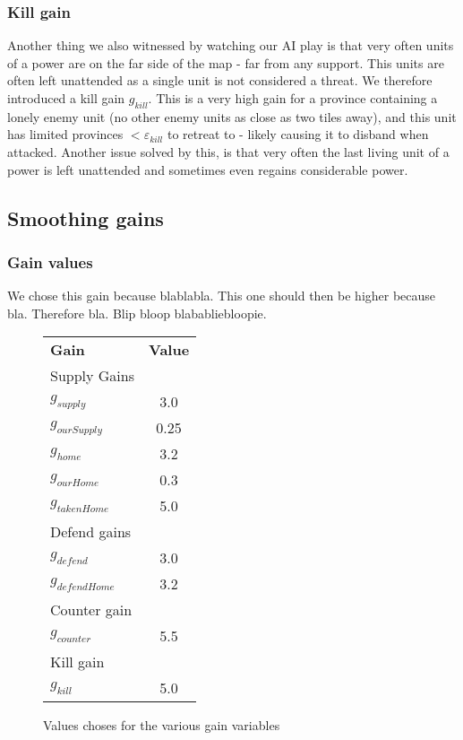 \documentclass[a4paper]{article} %
\begin{document}
\subsubsection{Kill gain}
Another thing we also witnessed by watching our AI play is that very often units of a power are on the far side of the map - far from any support. This units are often left unattended as a single unit is not considered a threat. We therefore introduced a kill gain $g_{kill}$. This is a very high gain for a province containing a lonely enemy unit (no other enemy units as close as two tiles away), and this unit has limited provinces $< \varepsilon_{kill}$ to retreat to - likely causing it to disband when attacked. 
Another issue solved by this, is that very often the last living unit of a power is left unattended and sometimes even regains considerable power. 

\subsection{Smoothing gains}


\subsubsection{Gain values}

We chose this gain because blablabla. This one should then be higher because bla. Therefore bla. Blip bloop blababliebloopie. 

\begin{figure}[H]
\centering
\begin{tabular}{| l | c |}
  \hline            
  {\bf Gain} & {\bf Value}\\
  {Supply Gains} &  \\
  $g_{supply}$ & 3.0 \\
  $g_{ourSupply}$ & 0.25 \\
  $g_{home}$ & 3.2 \\
  $g_{ourHome}$ & 0.3 \\
  $g_{takenHome}$ & 5.0 \\
  {Defend gains} &  \\
  $g_{defend}$ &  3.0 \\
  $g_{defendHome}$ & 3.2 \\
  {Counter gain} & \\
  $g_{counter}$ & 5.5 \\
  {Kill gain} & \\
  $g_{kill}$ & 5.0 \\
  \hline  
\end{tabular}
\caption{Values choses for the various gain variables}
\end{figure}
\end{document}
